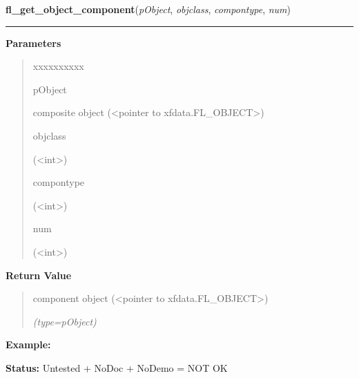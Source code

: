 \hspace{.8\funcindent}\begin{boxedminipage}{\funcwidth}

    \raggedright \textbf{fl\_get\_object\_component}(\textit{pObject}, \textit{objclass}, \textit{compontype}, \textit{num})

    \vspace{-1.5ex}

    \rule{\textwidth}{0.5\fboxrule}
\setlength{\parskip}{2ex}
\setlength{\parskip}{1ex}
      \textbf{Parameters}
      \vspace{-1ex}

      \begin{quote}
        \begin{Ventry}{xxxxxxxxxx}

          \item[pObject]

          composite object ({\textless}pointer to 
          xfdata.FL\_OBJECT{\textgreater})

          \item[objclass]

          ({\textless}int{\textgreater})

          \item[compontype]

          ({\textless}int{\textgreater})

          \item[num]

          ({\textless}int{\textgreater})

        \end{Ventry}

      \end{quote}

      \textbf{Return Value}
    \vspace{-1ex}

      \begin{quote}
      component object ({\textless}pointer to 
      xfdata.FL\_OBJECT{\textgreater})

      {\it (type=pObject)}

      \end{quote}

\textbf{Example:} 

\textbf{Status:} Untested + NoDoc + NoDemo = NOT OK



    \end{boxedminipage}

